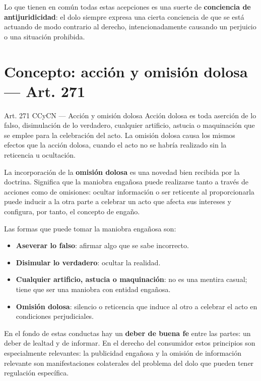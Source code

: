\documentclass[12pt,oneside]{book}
\begin{document}
Lo que tienen en común todas estas acepciones es una suerte de \textbf{conciencia de antijuridicidad}: el dolo siempre expresa una cierta conciencia de que se está actuando de modo contrario al derecho, intencionadamente causando un perjuicio o una situación prohibida.

\section{Concepto: acción y omisión dolosa --- Art. 271}

\begin{articulo}{Art. 271 CCyCN --- Acción y omisión dolosa}
Acción dolosa es toda aserción de lo falso, disimulación de lo verdadero, cualquier artificio, astucia o maquinación que se emplee para la celebración del acto. La omisión dolosa causa los mismos efectos que la acción dolosa, cuando el acto no se habría realizado sin la reticencia u ocultación.
\end{articulo}

La incorporación de la \textbf{omisión dolosa} es una novedad bien recibida por la doctrina. Significa que la maniobra engañosa puede realizarse tanto a través de acciones como de omisiones: ocultar información o ser reticente al proporcionarla puede inducir a la otra parte a celebrar un acto que afecta sus intereses y configura, por tanto, el concepto de engaño.

Las formas que puede tomar la maniobra engañosa son:
\begin{itemize}
    \item \textbf{Aseverar lo falso}: afirmar algo que se sabe incorrecto.
    \item \textbf{Disimular lo verdadero}: ocultar la realidad.
    \item \textbf{Cualquier artificio, astucia o maquinación}: no es una mentira casual; tiene que ser una maniobra con entidad engañosa.
    \item \textbf{Omisión dolosa}: silencio o reticencia que induce al otro a celebrar el acto en condiciones perjudiciales.
\end{itemize}

\begin{note}
En el fondo de estas conductas hay un \textbf{deber de buena fe} entre las partes: un deber de lealtad y de informar. En el derecho del consumidor estos principios son especialmente relevantes: la publicidad engañosa y la omisión de información relevante son manifestaciones colaterales del problema del dolo que pueden tener regulación específica.
\end{note}
\end{document}
